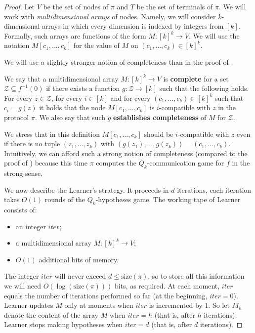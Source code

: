 \documentclass{toc}
\begin{document}
\begin{proof}
Let $V$ be the set of nodes of $\pi$ and $T$ be the set of terminals of $\pi$.  We will work with \emph{multidimensional arrays} of nodes. Namely, we will consider $k$-dimensional arrays in which every dimension is indexed by integers from $[k]$. Formally, such arrays are functions of the form $M\colon [k]^k\to V$. We will use the notation $M[c_1, \ldots, c_k]$ for the value of $M$ on $(c_1, \ldots, c_k) \in [k]^k$.

We will use a slightly stronger notion of completeness than in the proof of .

\begin{definition}
 We say that a multidimensional array $M\colon [k]^k \to V$ is \textbf{complete} for a set $\mathcal{Z}\subseteq f^{-1}(0)$ if there exists a function $g\colon\mathcal{Z} \to [k]$ such that the following holds. For every $z\in \mathcal{Z}$, for every $i\in [k]$ and for every $(c_1, \ldots, c_k)\in [k]^k$ such that $c_i = g(z)$ it holds that the node $M[c_1, \ldots, c_k]$ is $i$-compatible with $z$ in the protocol $\pi$. We also say that such $g$ \textbf{establishes completeness} of $M$ for $\mathcal{Z}$.
\end{definition}

We stress that in this definition $M[c_1, \ldots, c_k]$ should be $i$-compatible with $z$ even if there is no tuple $(z_1, \ldots, z_k)$ with $(g(z_1), \ldots, g(z_k)) = (c_1, \ldots, c_k)$. Intuitively, we can afford such a strong notion of completeness (compared to the proof of ) because this time $\pi$ computes the $Q_k$-communication game for $f$ in the strong sense.

We now describe the Learner's strategy. It proceeds in $d$ iterations, each iteration takes $O(1)$ rounds of the $Q_k$-hypotheses game. The working tape of Learner consists of:
\begin{itemize}
\item an integer $iter$;
\item a multidimensional array $M\colon [k]^k \to V$;
\item $O(1)$ additional bits of memory. 
\end{itemize}
The integer $iter$ will never exceed $d\le \mathrm{size}(\pi)$, so to store all this information we will need $O(\log (\mathrm{size}(\pi)))$ bits, as required. At each moment, $iter$ equals the number of iterations performed so far (at the beginning, $iter = 0$). Learner updates $M$ only at moments when $iter$ is incremented by $1$. So let $M_h$ denote the content of the array $M$ when $iter = h$ (that is, after $h$ iterations). Learner stops making hypotheses when $iter = d$ (that is, after $d$ iterations).


\end{proof}
\end{document}
